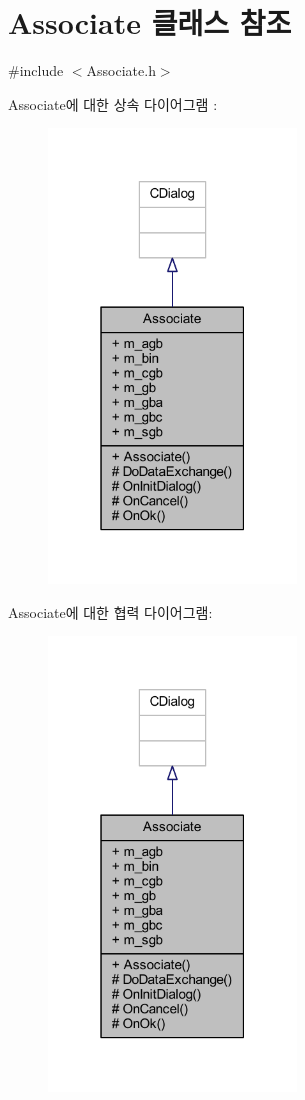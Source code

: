 \hypertarget{class_associate}{}\section{Associate 클래스 참조}
\label{class_associate}


{\ttfamily \#include $<$Associate.\+h$>$}



Associate에 대한 상속 다이어그램 \+: \nopagebreak
\begin{figure}[H]
\begin{center}
\leavevmode
\includegraphics[width=187pt]{class_associate__inherit__graph}
\end{center}
\end{figure}


Associate에 대한 협력 다이어그램\+:\nopagebreak
\begin{figure}[H]
\begin{center}
\leavevmode
\includegraphics[width=187pt]{class_associate__coll__graph}
\end{center}
\end{figure}
